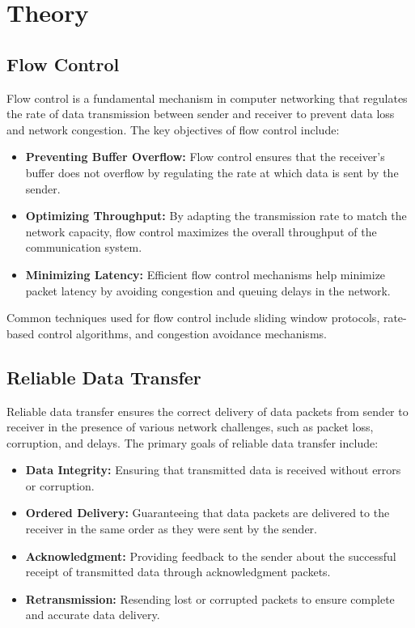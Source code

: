 \documentclass[11pt]{article}
\begin{document}
\section{Theory}
\subsection{Flow Control}
Flow control is a fundamental mechanism in computer networking that regulates the rate of data transmission between sender and receiver to prevent data loss and network congestion. The key objectives of flow control include:

\begin{itemize}
    \item \textbf{Preventing Buffer Overflow:} Flow control ensures that the receiver's buffer does not overflow by regulating the rate at which data is sent by the sender.
    \item \textbf{Optimizing Throughput:} By adapting the transmission rate to match the network capacity, flow control maximizes the overall throughput of the communication system.
    \item \textbf{Minimizing Latency:} Efficient flow control mechanisms help minimize packet latency by avoiding congestion and queuing delays in the network.
\end{itemize}

Common techniques used for flow control include sliding window protocols, rate-based control algorithms, and congestion avoidance mechanisms.

\subsection{Reliable Data Transfer}
Reliable data transfer ensures the correct delivery of data packets from sender to receiver in the presence of various network challenges, such as packet loss, corruption, and delays. The primary goals of reliable data transfer include:

\begin{itemize}
    \item \textbf{Data Integrity:} Ensuring that transmitted data is received without errors or corruption.
    \item \textbf{Ordered Delivery:} Guaranteeing that data packets are delivered to the receiver in the same order as they were sent by the sender.
    \item \textbf{Acknowledgment:} Providing feedback to the sender about the successful receipt of transmitted data through acknowledgment packets.
    \item \textbf{Retransmission:} Resending lost or corrupted packets to ensure complete and accurate data delivery.
\end{itemize}
\end{document}
